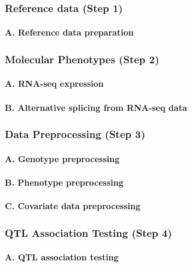 \documentclass[12pt]{article}
\begin{document}
\subsubsection*{Reference data (Step 1)}

\paragraph*{A.  Reference data preparation}


\subsubsection*{Molecular Phenotypes (Step 2)}

\paragraph*{A.  RNA-seq expression}


\paragraph*{B.  Alternative splicing from RNA-seq data}


\subsubsection*{Data Preprocessing (Step 3)}

\paragraph*{A.  Genotype preprocessing}


\paragraph*{B.  Phenotype preprocessing}


\paragraph*{C.  Covariate data preprocessing}


\subsubsection*{QTL Association Testing (Step 4)}

\paragraph*{A.  QTL association testing}
\end{document}
